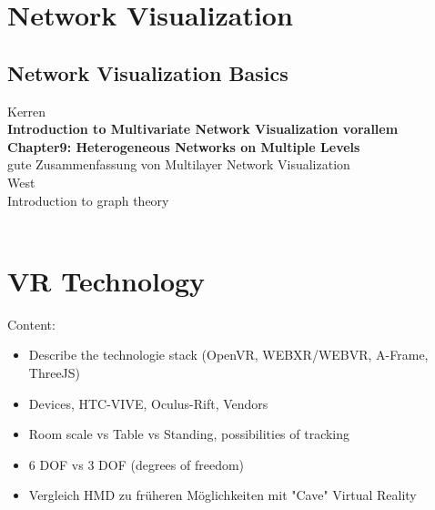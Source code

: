 \section{Network Visualization}

\subsection{Network Visualization Basics}

Kerren\\
\textbf{Introduction to Multivariate Network Visualization vorallem Chapter9: Heterogeneous Networks on Multiple Levels} \\
gute Zusammenfassung von Multilayer Network Visualization\\

West\\
Introduction to graph theory\\
\\


\section{VR Technology}

Content:
\begin{itemize}
    \item Describe the technologie stack (OpenVR, WEBXR/WEBVR, A-Frame, ThreeJS)
    \item Devices, HTC-VIVE, Oculus-Rift, Vendors
    \item Room scale vs Table vs Standing, possibilities of tracking
    \item 6 DOF vs 3 DOF (degrees of freedom)
    \item Vergleich HMD zu früheren Möglichkeiten mit "Cave" Virtual Reality
\end{itemize}

